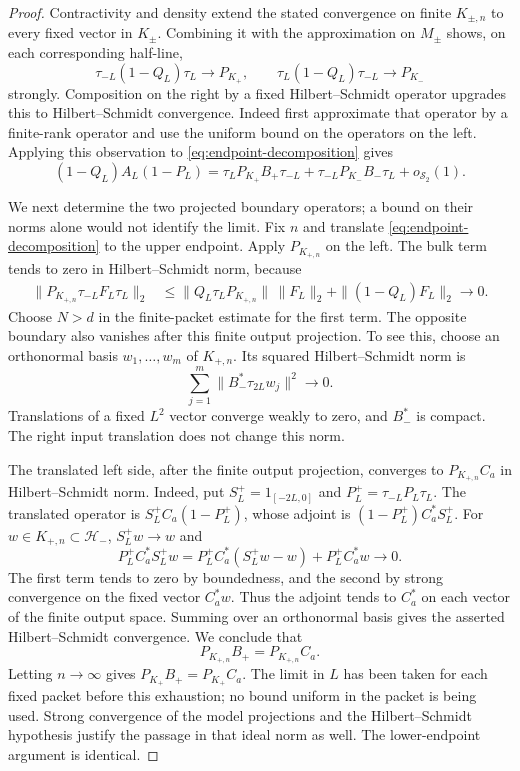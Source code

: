 \begin{proof}
Contractivity and density extend the stated convergence on finite
$K_{\pm,n}$ to every fixed vector in $K_\pm$.  Combining it with the
approximation on $M_\pm$ shows, on each corresponding half-line,
\[
 \tau_{-L}(1-Q_L)\tau_L\longrightarrow P_{K_+},\qquad
 \tau_L(1-Q_L)\tau_{-L}\longrightarrow P_{K_-}
\]
strongly.  Composition on the right by a fixed Hilbert--Schmidt
operator upgrades this to Hilbert--Schmidt convergence.  Indeed
first approximate that operator by a finite-rank operator and use
the uniform bound on the operators on the left.
Applying this observation to \eqref{eq:endpoint-decomposition} gives
\begin{equation}\label{eq:endpoint-residual}
 (1-Q_L)A_L(1-P_L)
 =\tau_LP_{K_+}B_+\tau_{-L}
  +\tau_{-L}P_{K_-}B_-\tau_L+o_{\mathcal S_2}(1).
\end{equation}

We next determine the two projected boundary operators; a bound on
their norms alone would not identify the limit.
Fix $n$ and translate \eqref{eq:endpoint-decomposition} to the upper
endpoint.  Apply $P_{K_{+,n}}$ on the left.  The bulk term tends to
zero in Hilbert--Schmidt norm, because
\[
 \begin{split}
 \|P_{K_{+,n}}\tau_{-L}F_L\tau_L\|_2
 &\leq\|Q_L\tau_LP_{K_{+,n}}\|\,\|F_L\|_2
          +\|(1-Q_L)F_L\|_2\longrightarrow0.
 \end{split}
\]
Choose $N>d$ in the finite-packet estimate for the first term.
The opposite boundary also vanishes after this finite output
projection.  To see this, choose an orthonormal basis $w_1,\ldots,w_m$
of $K_{+,n}$.  Its squared Hilbert--Schmidt norm is
\[
 \sum_{j=1}^m\|B_-^*\tau_{2L}w_j\|^2\longrightarrow0.
\]
Translations of a fixed $L^2$ vector converge weakly to zero, and
$B_-^*$ is compact.  The right input translation does not change
this norm.

The translated left side, after the finite output projection,
converges to $P_{K_{+,n}}C_a$ in Hilbert--Schmidt norm.
Indeed, put $S_L^+=1_{[-2L,0]}$ and $P_L^+=\tau_{-L}P_L\tau_L$.
The translated operator is $S_L^+C_a(1-P_L^+)$, whose adjoint is
$(1-P_L^+)C_a^*S_L^+$. For $w\in K_{+,n}\subset\mathcal H_-$,
$S_L^+w\to w$ and
\[
 P_L^+C_a^*S_L^+w
 =P_L^+C_a^*(S_L^+w-w)+P_L^+C_a^*w\longrightarrow0.
\]
The first term tends to zero by boundedness, and the second by strong
convergence on the fixed vector $C_a^*w$. Thus the adjoint tends to
$C_a^*$ on each vector of the finite output space. Summing over an
orthonormal basis gives the asserted Hilbert--Schmidt convergence.
We conclude that
\[
                 P_{K_{+,n}}B_+=P_{K_{+,n}}C_a.
\]
Letting $n\to\infty$ gives
$P_{K_+}B_+=P_{K_+}C_a$. The limit in $L$ has been taken for each
fixed packet before this exhaustion; no bound uniform in the packet
is being used. Strong convergence of the model projections
and the Hilbert--Schmidt hypothesis justify the passage in that
ideal norm as well.  The lower-endpoint argument is identical.


\end{proof}
